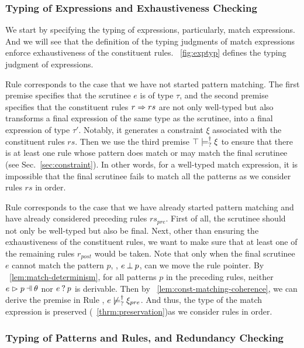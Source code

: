 \documentclass[runningheads,envcountsame,a4paper]{llncs}
\begin{document}
\subsubsection{Typing of Expressions and Exhaustiveness Checking} \label{sec:exptyp}

We start by specifying the typing of expressions, particularly, match
expressions. And we will see that the definition of the typing judgments of
match expressions enforce exhaustiveness of the constituent rules.
\figurename~\ref{fig:exptyp} defines the typing judgment of expressions.



Rule \TMatchZPre corresponds to the case that we have not started pattern
matching. The first premise specifies that the scrutinee $e$ is of type $\tau$,
and the second premise specifies that the constituent rules $r \Rightarrow rs$ are not only
well-typed but also transforms a final expression of the same type as the
scrutinee, into a final expression of type $\tau'$. Notably, it generates a
constraint $\xi$ associated with the constituent rules $rs$. Then we use the
third premise $\top \models_{?}^{\dag} \xi$ to ensure that there is at least
one rule whose pattern does match or may match the final scrutinee (see
Sec.~\ref{sec:constraint}). In other words, for a well-typed match expression,
it is impossible that the final scrutinee fails to match all the patterns as we
consider rules $rs$ in order.

Rule \TMatchNZPre corresponds to the case that we have already started pattern
matching and have already considered preceding rules $rs_{pre}$. First of all,
the scrutinee should not only be well-typed but also be final. Next, other than
ensuring the exhaustiveness of the constituent rules, we want to make sure that
at least one of the remaining rules $r_{post}$ would be taken. Note
that only when the final scrutinee $e$ cannot match the pattern $p$, \ie,
$e \mathbin{\bot} p$, can we move the rule pointer. By
\lemmaname~\ref{lem:match-determinism}, for all patterns $p$ in the preceding
rules, neither $\hpatmatch{e}{p}{\theta}$ nor $e \mathbin{?} p$ is derivable.
Then by \lemmaname~\ref{lem:const-matching-coherence}, we can derive the premise
in Rule \TMatchNZPre, $e \not\models_{?}^{\dag} \xi_{pre}$. And thus, the type of
the match expression is preserved (\theoremname~\ref{thrm:preservation})as we consider rules in order.

\subsubsection{Typing of Patterns and Rules, and Redundancy Checking}
\end{document}
